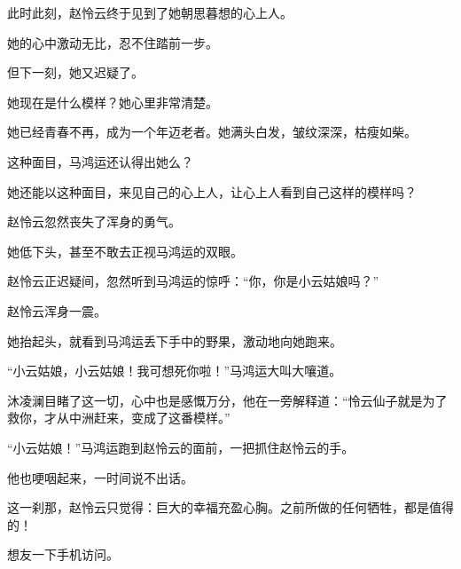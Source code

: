 \begin{this_body}
此时此刻，赵怜云终于见到了她朝思暮想的心上人。

她的心中激动无比，忍不住踏前一步。

但下一刻，她又迟疑了。

她现在是什么模样？她心里非常清楚。

她已经青春不再，成为一个年迈老者。她满头白发，皱纹深深，枯瘦如柴。

这种面目，马鸿运还认得出她么？

她还能以这种面目，来见自己的心上人，让心上人看到自己这样的模样吗？

赵怜云忽然丧失了浑身的勇气。

她低下头，甚至不敢去正视马鸿运的双眼。

赵怜云正迟疑间，忽然听到马鸿运的惊呼：“你，你是小云姑娘吗？”

赵怜云浑身一震。

她抬起头，就看到马鸿运丢下手中的野果，激动地向她跑来。

“小云姑娘，小云姑娘！我可想死你啦！”马鸿运大叫大嚷道。

沐凌澜目睹了这一切，心中也是感慨万分，他在一旁解释道：“怜云仙子就是为了救你，才从中洲赶来，变成了这番模样。”

“小云姑娘！”马鸿运跑到赵怜云的面前，一把抓住赵怜云的手。

他也哽咽起来，一时间说不出话。

这一刹那，赵怜云只觉得：巨大的幸福充盈心胸。之前所做的任何牺牲，都是值得的！

想友一下手机访问。

\end{this_body}

